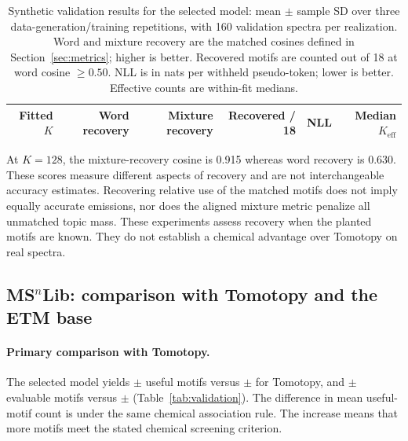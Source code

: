 \documentclass[10pt,a4paper]{article}
\begin{document}
\begin{table}[H]
\centering\small
\setlength{\tabcolsep}{6pt}
\caption{Synthetic validation results for the selected model: mean $\pm$
sample SD over three data-generation/training repetitions, with 160 validation
spectra per realization. Word and mixture recovery are the matched cosines
defined in Section~\ref{sec:metrics}; higher is better. Recovered motifs are
counted out of 18 at word cosine $\geq0.50$. NLL is in nats per withheld
pseudo-token; lower is better. Effective counts are within-fit medians.}
\label{tab:synthetic}
\begin{tabular}{@{}rrrrrr@{}}
\toprule
Fitted $K$ & Word recovery & Mixture recovery & Recovered / 18 & NLL & Median $K_{\mathrm{eff}}$ \\
\midrule

\end{tabular}
\end{table}

At $K=128$, the mixture-recovery cosine is 0.915 whereas word recovery is
0.630. These scores measure different aspects of recovery and are not
interchangeable accuracy estimates. Recovering relative use of the matched
motifs does not imply equally accurate emissions, nor does the aligned
mixture metric penalize all unmatched topic mass. These experiments assess
recovery when the planted motifs are known. They do not establish a chemical
advantage over Tomotopy on real spectra.

\subsection{MS\texorpdfstring{$^{n}$}{n}Lib: comparison with Tomotopy and the ETM base}

\paragraph{Primary comparison with Tomotopy.}

The selected model yields \CurrentUsefulMean{}$\pm$\CurrentUsefulSD{} useful
motifs versus \ReferenceLDAUseful{}$\pm$\ReferenceLDAUsefulSD{} for Tomotopy,
and \CurrentEvaluableMean{}$\pm$\CurrentEvaluableSD{} evaluable motifs versus
\ReferenceLDAEvaluable{}$\pm$\ReferenceLDAEvaluableSD{}
(Table~\ref{tab:validation}). The difference in mean useful-motif count is
\CurrentUsefulDifference{} under the same chemical association rule.
The increase means that more motifs meet the stated chemical screening criterion.
\end{document}
